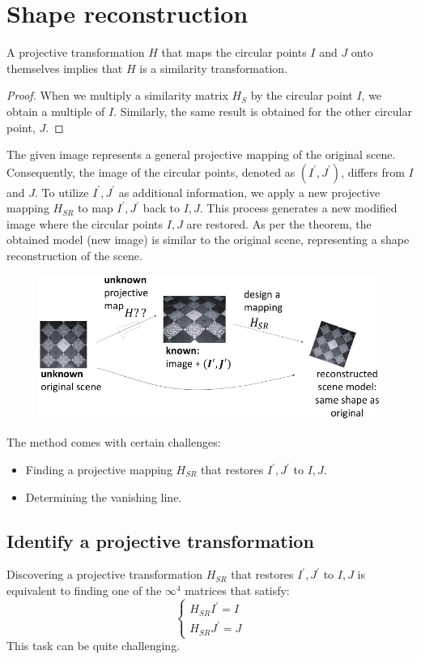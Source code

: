 \section{Shape reconstruction}

\begin{theorem}
    A projective transformation $H$ that maps the circular points $I$ and $J$ onto themselves implies that $H$ is a similarity transformation. 
\end{theorem}
\begin{proof}
    When we multiply a similarity matrix $H_S$ by the circular point $I$, we obtain a multiple of $I$.
    Similarly, the same result is obtained for the other circular point, $J$.
\end{proof}
The given image represents a general projective mapping of the original scene. 
Consequently, the image of the circular points, denoted as $(I^{'},J^{'})$, differs from $I$ and $J$. 
To utilize $I^{'},J^{'}$ as additional information, we apply a new projective mapping $H_{SR}$ to map $I^{'},J^{'}$ back to $I,J$. 
This process generates a new modified image where the circular points $I,J$ are restored.
As per the theorem, the obtained model (new image) is similar to the original scene, representing a shape reconstruction of the scene.
\begin{figure}[H]
    \centering
    \includegraphics[width=0.75\linewidth]{images/HSR.png}
\end{figure}
The method comes with certain challenges:
\begin{itemize}
    \item Finding a projective mapping $H_{SR}$ that restores $I^{'},J^{'}$ to $I,J$. 
    \item Determining the vanishing line.
\end{itemize}

\subsection{Identify a projective transformation}
Discovering a projective transformation $H_{SR}$ that restores $I^{'}, J^{'}$ to $I, J$ is equivalent to finding one of the $\infty^{4}$ matrices that satisfy:
\[\begin{cases}
    H_{SR}I^{'}=I \\
    H_{SR}J^{'}=J
\end{cases}\]
This task can be quite challenging.

